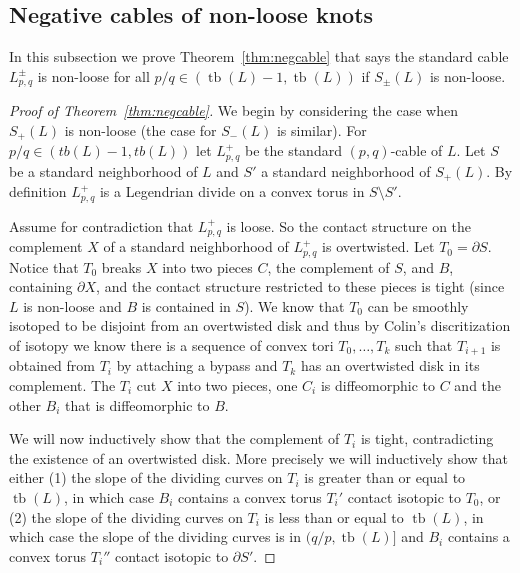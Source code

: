 \documentclass[11pt]{amsart}
\theoremstyle{plain}
\theoremstyle{definition}
\theoremstyle{remark}
\numberwithin{theorem}{section}
\DeclareMathOperator\tb{tb}                   %
\begin{document}
\subsection{Negative cables of non-loose knots} 
In this subsection we prove Theorem~\ref{thm:negcable} that says 
the standard cable $L_{p,q}^\pm$ is non-loose for all $p/q\in(\tb(L)-1, \tb(L))$ if $S_\pm(L)$ is non-loose.
\begin{proof}[Proof of Theorem~\ref{thm:negcable}]
We begin by considering the case when $S_+(L)$ is non-loose (the case for $S_-(L)$ is similar). For $p/q\in (tb(L)-1, tb(L))$ let $L^+_{p,q}$ be the standard $(p,q)$-cable of $L$. Let $S$ be a standard neighborhood of $L$ and $S'$ a standard neighborhood of $S_+(L)$. By definition $L^+_{p,q}$ is a Legendrian divide on a convex torus in $S\setminus S'$.

Assume for contradiction that $L^+_{p,q}$ is loose. So the contact structure on the complement $X$ of a standard neighborhood of $L^+_{p,q}$ is overtwisted. Let $T_0=\partial S$. Notice that $T_0$ breaks $X$ into two pieces $C$, the complement of $S$, and $B$, containing $\partial X$, and the contact structure restricted to these pieces is tight (since $L$ is non-loose and $B$ is contained in $S$). We know that $T_0$ can be smoothly isotoped to be disjoint from an overtwisted disk and thus by Colin's discritization of isotopy \cite{Honda02} we know there is a sequence of convex tori $T_0,\ldots, T_k$ such that $T_{i+1}$ is obtained from $T_i$ by attaching a bypass and $T_k$ has an overtwisted disk in its complement. The $T_i$ cut $X$ into two pieces, one $C_i$ is diffeomorphic to $C$ and the other $B_i$ that is diffeomorphic to $B$.

We will now inductively show that the complement of $T_i$ is tight, contradicting the existence of an overtwisted disk. More precisely we will inductively show that either (1) the slope of the dividing curves on $T_i$ is greater than or equal to $\tb(L)$, in which case $B_i$ contains a convex torus $T_i'$ contact isotopic to $T_0$, or (2) the slope of the dividing curves on $T_i$ is less than or equal to $\tb(L)$, in which case the slope of the dividing curves is in $(q/p, \tb(L)]$ and $B_i$ contains a convex torus $T_i''$ contact isotopic to $\partial S'$.  


\end{proof}
\end{document}
